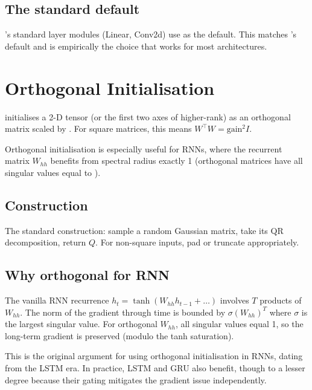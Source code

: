 \subsection{The standard default}
\label{ssec:initialization:kaiming_default}

\Lucid's standard layer modules (Linear, Conv2d) use
 as the default. This
matches 's default and is empirically the choice
that works for most architectures.

\section{Orthogonal Initialisation}
\label{sec:initialization:orthogonal}

 initialises a 2-D
tensor (or the first two axes of higher-rank) as an orthogonal
matrix scaled by . For square matrices, this means
$W^\top W = \mathrm{gain}^2 I$.

Orthogonal initialisation is especially useful for RNNs, where
the recurrent matrix $W_{hh}$ benefits from spectral radius
exactly 1 (orthogonal matrices have all singular values equal to
).

\subsection{Construction}
\label{ssec:initialization:orthogonal_construction}

The standard construction: sample a random Gaussian matrix, take
its QR decomposition, return $Q$. For non-square inputs, pad or
truncate appropriately.

\subsection{Why orthogonal for RNN}
\label{ssec:initialization:why_orth_rnn}

The vanilla RNN recurrence $h_t = \tanh(W_{hh} h_{t-1} + \ldots)$
involves $T$ products of $W_{hh}$. The norm of the gradient
through time is bounded by $\sigma(W_{hh})^T$ where
$\sigma$ is the largest singular value. For orthogonal $W_{hh}$,
all singular values equal 1, so the long-term gradient is
preserved (modulo the tanh saturation).

This is the original argument for using orthogonal
initialisation in RNNs, dating from the LSTM era. In practice,
LSTM and GRU also benefit, though to a lesser degree because
their gating mitigates the gradient issue independently.

